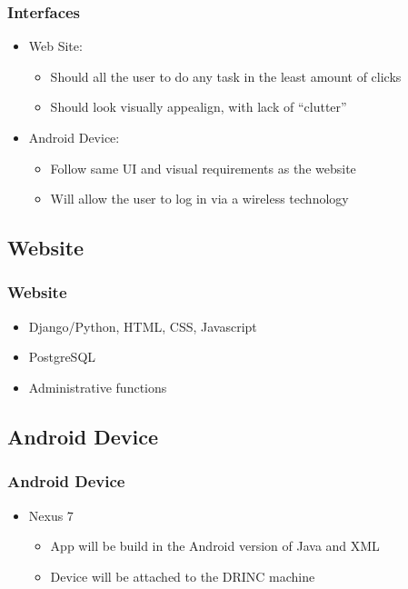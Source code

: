 \begin{frame}
    \frametitle{Interfaces}
    \begin{itemize}
        \item {\large Web Site:}
        \begin{itemize}
            \item Should all the user to do any task in the least amount of 
            clicks
            \item Should look visually appealign, with lack of ``clutter''
        \end{itemize}
        \item {\large Android Device:}
        \begin{itemize}
            \item Follow same UI and visual requirements as the website
            \item Will allow the user to log in via a wireless technology
        \end{itemize}
    \end{itemize}
\end{frame}

\subsection{Website}
\begin{frame}
    \frametitle{Website}
    \begin{itemize}
        \item Django/Python, HTML, CSS, Javascript
        \item PostgreSQL
        \item Administrative functions
    \end{itemize}
\end{frame}

\subsection{Android Device}
\begin{frame}
    \frametitle{Android Device}
    \begin{itemize}
        \item {\large Nexus 7}
        \begin{itemize}
            \item App will be build in the Android version of Java and XML
            \item Device will be attached to the DRINC machine
        \end{itemize}
    \end{itemize}
\end{frame}

